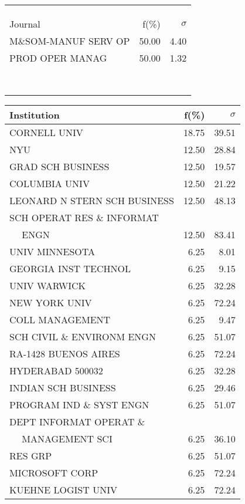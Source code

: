 \documentclass[a4paper,11pt]{report}
\begin{document}
\begin{landscape}
\begin{table}[!ht]
{\begin{tabular}{|l r  r|}
 &  & \\
 &  & \\
 &  & \\
\hline
\hline
Journal & f(\%) & $\sigma$\\
\hline
M\&SOM-MANUF SERV OP & 50.00 & 4.40\\
PROD OPER MANAG & 50.00 & 1.32\\
 &  & \\
 &  & \\
 &  & \\
 &  & \\
 &  & \\
 &  & \\
 &  & \\
 &  & \\
\hline
\end{tabular}
}
{\scriptsize\begin{tabular}{|l r r|}
\hline
Institution & f(\%) & $\sigma$\\
\hline
CORNELL UNIV & 18.75 & 39.51\\
NYU & 12.50 & 28.84\\
GRAD SCH BUSINESS & 12.50 & 19.57\\
COLUMBIA UNIV & 12.50 & 21.22\\
LEONARD N STERN SCH BUSINESS & 12.50 & 48.13\\
SCH OPERAT RES \& INFORMAT &  & \\
$\quad$ ENGN & 12.50 & 83.41\\
UNIV MINNESOTA & 6.25 & 8.01\\
GEORGIA INST TECHNOL & 6.25 & 9.15\\
UNIV WARWICK & 6.25 & 32.28\\
NEW YORK UNIV & 6.25 & 72.24\\
COLL MANAGEMENT & 6.25 & 9.47\\
SCH CIVIL \& ENVIRONM ENGN & 6.25 & 51.07\\
RA-1428 BUENOS AIRES & 6.25 & 72.24\\
HYDERABAD 500032 & 6.25 & 32.28\\
INDIAN SCH BUSINESS & 6.25 & 29.46\\
PROGRAM IND \& SYST ENGN & 6.25 & 51.07\\
DEPT INFORMAT OPERAT \& &  & \\
$\quad$ MANAGEMENT SCI & 6.25 & 36.10\\
RES GRP & 6.25 & 51.07\\
MICROSOFT CORP & 6.25 & 72.24\\
KUEHNE LOGIST UNIV & 6.25 & 72.24\\

\end{tabular}}
\end{table}
\end{landscape}
\end{document}

